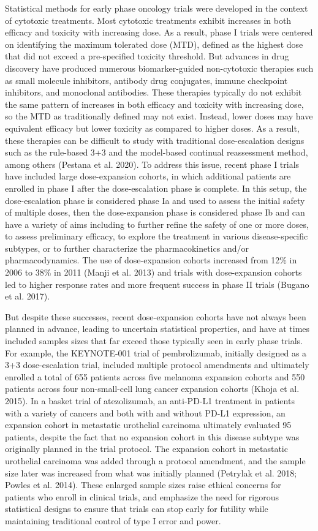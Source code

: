 Statistical methods for early phase oncology trials were developed in the context of cytotoxic treatments. Most cytotoxic treatments exhibit increases in both efficacy and toxicity with increasing dose. As a result, phase I trials were centered on identifying the maximum tolerated dose (MTD), defined as the highest dose that did not exceed a pre-specified toxicity threshold. But advances in drug discovery have produced numerous biomarker-guided non-cytotoxic therapies such as small molecule inhibitors, antibody drug conjugates, immune checkpoint inhibitors, and monoclonal antibodies. These therapies typically do not exhibit the same pattern of increases in both efficacy and toxicity with increasing dose, so the MTD as traditionally defined may not exist. Instead, lower doses may have equivalent efficacy but lower toxicity as compared to higher doses. As a result, these therapies can be difficult to study with traditional dose-escalation designs such as the rule-based 3+3 and the model-based continual reassessment method, among others (Pestana et al. 2020). To address this issue, recent phase I trials have included large dose-expansion cohorts, in which additional patients are enrolled in phase I after the dose-escalation phase is complete. In this setup, the dose-escalation phase is considered phase Ia and used to assess the initial safety of multiple doses, then the dose-expansion phase is considered phase Ib and can have a variety of aims including to further refine the safety of one or more doses, to assess preliminary efficacy, to explore the treatment in various disease-specific subtypes, or to further characterize the pharmacokinetics and/or pharmacodynamics. The use of dose-expansion cohorts increased from 12\% in 2006 to 38\% in 2011 (Manji et al. 2013) and trials with dose-expansion cohorts led to higher response rates and more frequent success in phase II trials (Bugano et al. 2017).

But despite these successes, recent dose-expansion cohorts have not always been planned in advance, leading to uncertain statistical properties, and have at times included samples sizes that far exceed those typically seen in early phase trials. For example, the KEYNOTE-001 trial of pembrolizumab, initially designed as a 3+3 dose-escalation trial, included multiple protocol amendments and ultimately enrolled a total of 655 patients across five melanoma expansion cohorts and 550 patients across four non-small-cell lung cancer expansion cohorts (Khoja et al. 2015). In a basket trial of atezolizumab, an anti-PD-L1 treatment in patients with a variety of cancers and both with and without PD-L1 expression, an expansion cohort in metastatic urothelial carcinoma ultimately evaluated 95 patients, despite the fact that no expansion cohort in this disease subtype was originally planned in the trial protocol. The expansion cohort in metastatic urothelial carcinoma was added through a protocol amendment, and the sample size later was increased from what was initially planned (Petrylak et al. 2018; Powles et al. 2014). These enlarged sample sizes raise ethical concerns for patients who enroll in clinical trials, and emphasize the need for rigorous statistical designs to ensure that trials can stop early for futility while maintaining traditional control of type I error and power.

